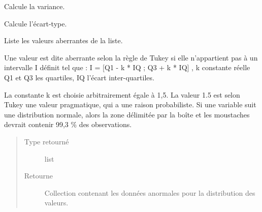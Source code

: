 \documentclass[letterpaper,10pt,openany,oneside,french]{sphinxmanual}
\begin{document}

\begin{fulllineitems}
\label{\detokenize{addQuantitativesDiscretes:add.addQuantitativesDiscretes.variance}}
Calcule la variance.

\end{fulllineitems}


\begin{fulllineitems}
\label{\detokenize{addQuantitativesDiscretes:add.addQuantitativesDiscretes.ecartType}}
Calcule l’écart-type.

\end{fulllineitems}


\begin{fulllineitems}
\label{\detokenize{addQuantitativesDiscretes:add.addQuantitativesDiscretes.anomaliesTukey}}
Liste les valeurs aberrantes de la liste.

Une valeur est dite aberrante selon la règle de Tukey si elle n’appartient pas à un intervalle I définit tel que :
I = {[}Q1 - k * IQ ; Q3 + k * IQ{]} , k constante réelle Q1 et Q3 les quartiles, IQ l’écart inter-quartiles.

La constante k est choisie arbitrairement égale à 1,5. La valeur 1.5 est selon Tukey une valeur pragmatique, qui a une raison probabiliste.
Si une variable suit une distribution normale, alors la zone délimitée par la boîte et les moustaches devrait contenir 99,3 \% des observations.
\begin{quote}\begin{description}
\item[{Type retourné}] \leavevmode
list

\item[{Retourne}] \leavevmode
Collection contenant les données anormales pour la distribution des valeurs.

\end{description}\end{quote}

\end{fulllineitems}
\end{document}
